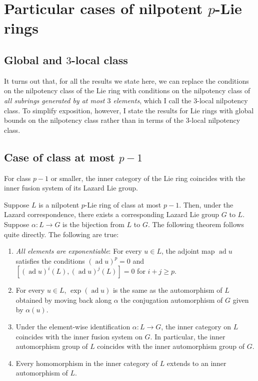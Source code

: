 \documentclass[10pt]{amsart}
\newcommand{\ad}{\operatorname{ad}}
\begin{document}
\section{Particular cases of nilpotent $p$-Lie rings}

\subsection{Global and $3$-local class}

It turns out that, for all the results we state here, we can replace
the conditions on the nilpotency class of the Lie ring with conditions
on the nilpotency class of {\em all subrings generated by at most $3$
elements}, which I call the $3$-local nilpotency class. To simplify
exposition, however, I state the results for Lie rings with global
bounds on the nilpotency class rather than in terms of the $3$-local
nilpotency class.
\subsection{Case of class at most $p - 1$}

For class $p - 1$ or smaller, the inner category of the Lie ring
coincides with the inner fusion system of its Lazard Lie group.

\begin{theorem}\label{lazard-p-innercategory}
  Suppose $L$ is a nilpotent $p$-Lie ring of class at most $p -
  1$. Then, under the Lazard correspondence, there exists a
  corresponding Lazard Lie group $G$ to $L$. Suppose $\alpha: L \to G$
  is the bijection from $L$ to $G$. The following theorem follows
  quite directly.  The following are true:

  \begin{enumerate}
  \item {\em All elements are exponentiable}: For every $u \in L$, the
    adjoint map $\ad u$ satisfies the conditions $(\ad u)^p = 0$ and
    $[(\ad u)^i(L),(\ad u)^j(L)] = 0$ for $i + j \ge p$.
  \item For every $u \in L$, $\exp(\ad u)$ is the same as the
    automorphism of $L$ obtained by moving back along $\alpha$ the
    conjugation automorphism of $G$ given by $\alpha(u)$.
  \item Under the element-wise identification $\alpha:L \to G$, the
    inner category on $L$ coincides with the inner fusion system on
    $G$. In particular, the inner automorphism group of $L$ coincides
    with the inner automorphism group of $G$.
  \item Every homomorphism in the inner category of $L$ extends to an
    inner automorphism of $L$.
  \end{enumerate}
\end{theorem}
\end{document}
